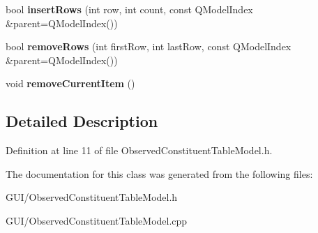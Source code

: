 \begin{DoxyCompactItemize}
bool {\bfseries insert\+Rows} (int row, int count, const Q\+Model\+Index \&parent=Q\+Model\+Index())
\item 
\mbox{\label{class_observed_constituent_table_model_a7f654b4b43054582a9f04aac492d9aeb}} 
bool {\bfseries remove\+Rows} (int first\+Row, int last\+Row, const Q\+Model\+Index \&parent=Q\+Model\+Index())
\item 
\mbox{\label{class_observed_constituent_table_model_a254c5634854b56665f8b9a9e95fe2902}} 
void {\bfseries remove\+Current\+Item} ()
\end{DoxyCompactItemize}


\subsection{Detailed Description}


Definition at line 11 of file Observed\+Constituent\+Table\+Model.\+h.



The documentation for this class was generated from the following files\+:\begin{DoxyCompactItemize}
\item 
G\+U\+I/Observed\+Constituent\+Table\+Model.\+h\item 
G\+U\+I/Observed\+Constituent\+Table\+Model.\+cpp\end{DoxyCompactItemize}
